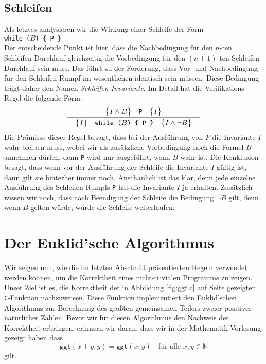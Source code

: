 \subsection{Schleifen}
Als letztes analysieren wir die Wirkung einer Schleife der Form 
\\[0.2cm]
\hspace*{1.3cm}
\texttt{while ($B$) \{ P \}} 
\\[0.2cm]
Der entscheidende Punkt ist hier, dass die Nachbedingung f\"ur den $n$-ten
Schleifen-Durchlauf gleichzeitig die Vorbedingung f\"ur den $(n\!+\!1)$-ten Schleifen-Durchlauf
sein muss.  Das f\"uhrt zu der Forderung, dass Vor- und Nachbedingung f\"ur den
Schleifen-Rumpf im wesentlichen identisch sein m\"ussen.  Diese Bedingung tr\"agt daher den
Namen \emph{Schleifen-Invariante}.  Im Detail hat die Verifikations-Regel die folgende Form:
\[ 
  \bruch{\hoare{I \wedge B}{P}{I}}{\quad \hoare{I}{while ($B$) \{ P \}}{I \wedge \neg B}\quad}
\]
Die Pr\"amisse dieser Regel besagt, dass bei der Ausf\"uhrung von $P$ die Invariante $I$
wahr bleiben muss, wobei wir als zus\"atzliche Vorbedingung noch die Formel $B$ annehmen
d\"urfen, denn \texttt{P} wird  nur ausgef\"uhrt, wenn $B$ wahr ist.
Die Konklusion besagt, dass wenn vor der Ausf\"uhrung der Schleife die Invariante $I$ g\"ultig
ist, dann gilt sie hinterher immer noch.  Anschaulich ist das klar, denn jede einzelne
Ausf\"uhrung des Schleifen-Rumpfs \texttt{P} hat die Invariante $I$ ja erhalten.
Zus\"atzlich wissen wir noch, dass nach Beendigung der Schleife die Bedingung $\neg B$ gilt,
denn wenn $B$ gelten w\"urde, w\"urde die Schleife weiterlaufen.


\section{Der Euklid'sche Algorithmus}
Wir zeigen nun, wie die im letzten Abschnitt pr\"asentierten Regeln verwendet werden k\"onnen,
um die Korrektheit eines nicht-trivialen Programms zu zeigen.  Unser Ziel ist es, die
Korrektheit der in Abbildung \ref{fig:ggt.c} auf Seite \pageref{fig:ggt.c} gezeigten
\texttt{C}-Funktion nachzuweisen.  Diese Funktion implementiert den Euklid'schen
Algorithmus zur Berechnung des gr\"o{\ss}ten gemeinsamen Teilers zweier positiver nat\"urlicher
Zahlen.  Bevor wir f\"ur diesen Algorithmus den Nachweis der Korrektheit
erbringen, erinnern wir daran, dass wir in der Mathematik-Vorlesung gezeigt haben dass
\[ \texttt{ggt}(x + y, y) = \texttt{ggt}(x,y) \quad \mbox{f\"ur alle $x, y \in \mathbb{N}$} \]  
gilt.


